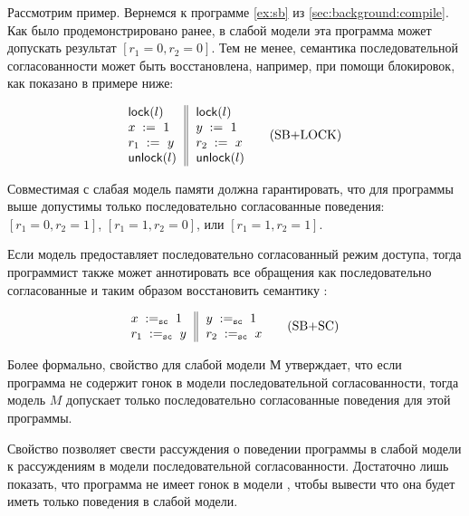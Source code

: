 Рассмотрим пример. 
Вернемся к программе \ref{ex:sb} из \cref{sec:background:compile}.
Как было продемонстрировано ранее, в слабой модели 
эта программа может допускать результат ${[r_1=0, r_2=0]}$.
Тем не менее, семантика последовательной согласованности
может быть восстановлена, например, при помощи блокировок, 
как показано в примере ниже:

\begin{equation*}
\inarrII{
   \lockInst{l}         \\
   \writeInst{}{x}{1}   \\
   \readInst{}{r_1}{y}  \\
   \unlockInst{l}       \\
}{
   \lockInst{l}         \\
   \writeInst{}{y}{1}   \\
   \readInst{}{r_2}{x}  \\
   \unlockInst{l}       \\
}
\tag{SB+LOCK}\label{ex:sb-lock}
\end{equation*}

Совместимая с \DRF слабая модель памяти должна гарантировать, 
что для программы выше допустимы только 
последовательно согласованные поведения:
${[r_1=0, r_2=1]}$, ${[r_1=1,r_2=0]}$, или ${[r_1=1,r_2=1]}$.

Если модель предоставляет последовательно согласованный 
режим доступа, тогда программист также может 
аннотировать все обращения как последовательно согласованные
и таким образом восстановить семантику \SC:
 
\begin{equation*}
\inarrII{
   \writeInst{\sco}{x}{1}   \\
   \readInst{\sco}{r_1}{y}  \\
}{
   \writeInst{\sco}{y}{1}   \\
   \readInst{\sco}{r_2}{x}  \\
}
\tag{SB+SC}\label{ex:sb-sc}
\end{equation*}

Более формально, \DRF свойство для слабой модели $М$
утверждает, что если программа не содержит гонок в модели 
последовательной согласованности, тогда модель $M$
допускает только последовательно согласованные поведения
для этой программы.

Свойство \DRF позволяет свести рассуждения о поведении программы 
в слабой модели к рассуждениям в модели последовательной согласованности.
Достаточно лишь показать, что программа не имеет гонок 
в модели \SC, чтобы вывести что она будет иметь только \SC поведения 
в слабой модели. 

